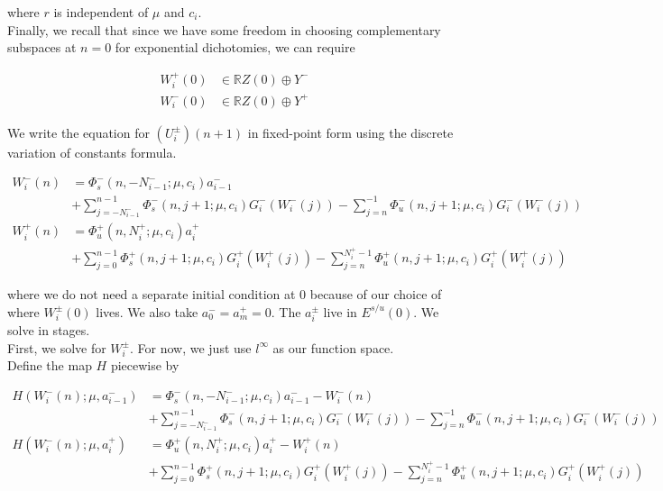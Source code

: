 \documentclass[12pt]{article}
\def\R{{\mathbb R}}
\begin{document}
where $r$ is independent of $\mu$ and $c_i$. \\

Finally, we recall that since we have some freedom in choosing complementary subspaces at $n = 0$ for exponential dichotomies, we can require

\begin{align*}
W_i^+(0) &\in \R Z(0) \oplus Y^- \\
W_i^-(0) &\in \R Z(0) \oplus Y^+
\end{align*}

We write the equation for $(U_i^\pm)(n+1)$ in fixed-point form using the discrete variation of constants formula.

\begin{align*}
W_i^-(n) &= 
\Phi_s^-(n, -N_{i-1}^-; \mu, c_i) a_{i-1}^- \\
&+ \sum_{j = -N_{i-1}^-}^{n-1} \Phi_s^-(n, j+1; \mu, c_i) G_i^-(W_i^-(j)) - \sum_{j = n}^{-1} \Phi_u^-(n, j+1; \mu, c_i) G_i^-(W_i^-(j)) \\
W_i^+(n) &= \Phi_u^+(n, N_i^+; \mu, c_i) a_i^+ \\
&+ \sum_{j = 0}^{n-1} \Phi_s^+(n, j+1; \mu, c_i) G_i^+(W_i^+(j)) 
- \sum_{j = n}^{N_i^+-1} \Phi_u^+(n, j+1; \mu, c_i) G_i^+(W_i^+(j))
\end{align*}

where we do not need a separate initial condition at 0 because of our choice of where $W_i^\pm(0)$ lives. We also take $a_0^- = a_m^+ = 0$. The $a_i^\pm$ live in $E^{s/u}(0)$. We solve in stages.\\

First, we solve for $W_i^\pm$. For now, we just use $l^\infty$ as our function space.\\

Define the map $H$ piecewise by

\begin{align*}
H(W_i^-(n); \mu, a_{i-1}^-) &= 
\Phi_s^-(n, -N_{i-1}^-; \mu, c_i) a_{i-1}^- - W_i^-(n) \\
&+ \sum_{j = -N_{i-1}^-}^{n-1} \Phi_s^-(n, j+1; \mu, c_i) G_i^-(W_i^-(j)) - \sum_{j = n}^{-1} \Phi_u^-(n, j+1; \mu, c_i) G_i^-(W_i^-(j)) \\
H(W_i^-(n); \mu, a_i^+) &= \Phi_u^+(n, N_i^+; \mu, c_i) a_i^+ - W_i^+(n)  \\
&+ \sum_{j = 0}^{n-1} \Phi_s^+(n, j+1; \mu, c_i) G_i^+(W_i^+(j)) 
- \sum_{j = n}^{N_i^+-1} \Phi_u^+(n, j+1; \mu, c_i) G_i^+(W_i^+(j))
\end{align*}
\end{document}
